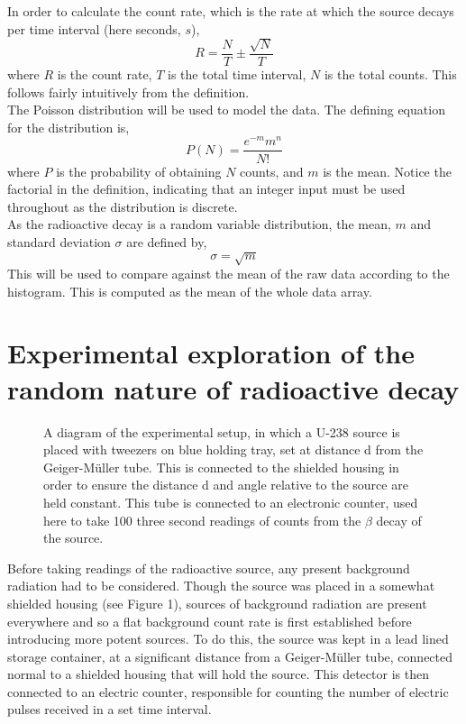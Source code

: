 \documentclass[11pt]{article}
\begin{document}
In order to calculate the count rate, which is the rate at which the source decays per time interval (here seconds, $s$), 
  \begin{equation} 
  R = \frac{N}{T} \pm \frac{\sqrt{N}}{T}
   \end{equation}
where $R$ is the count rate, $T$ is the total time interval, $N$ is the total counts. This follows fairly intuitively from the definition. \\
The Poisson distribution will be used to model the data. The defining equation for the distribution is, 
    \begin{equation}
        P(N) = \frac{e^{-m}m^{n}}{N!}
    \end{equation}
where $P$ is the probability of obtaining $N$ counts, and $m$ is the mean. Notice the factorial in the definition, indicating that an integer input must be used throughout as the distribution is discrete. \\
    As the radioactive decay is a random variable distribution, the mean, $m$ and standard deviation $\sigma$ are defined by,
    \begin{equation}
        \sigma = \sqrt{m}
    \end{equation}
This will be used to compare against the mean of the raw data according to the histogram. This is computed as the mean of the whole data array. 
    \section{Experimental exploration of the random nature of radioactive decay}
\begin{figure}[h]
        \begin{center}
            \def\svgwidth{\columnwidth}
            
             \caption{A diagram of the experimental setup, in which a U-238 source is placed with tweezers on blue holding tray, set at distance d from the Geiger-Müller tube. This is connected to the shielded housing in order to ensure the distance d and angle relative to the source are held constant. This tube is connected to an electronic counter, used here to take  100 three second readings of counts from the $\beta$ decay of the source.}
             \label{fig:experimental setup}
        \end{center}
    \end{figure}
\noindent Before taking readings of the radioactive source, any present background radiation had to be considered. Though the source was placed in a somewhat shielded housing (see Figure 1), sources of background radiation are present everywhere and so a flat background count rate is first established before introducing more potent sources. To do this, the source was kept in a lead lined storage container, at a significant distance from a Geiger-Müller tube, connected normal to a shielded housing that will hold the source. This detector is then connected to an electric counter, responsible for counting the number of electric pulses received in a set time interval.
\end{document}
